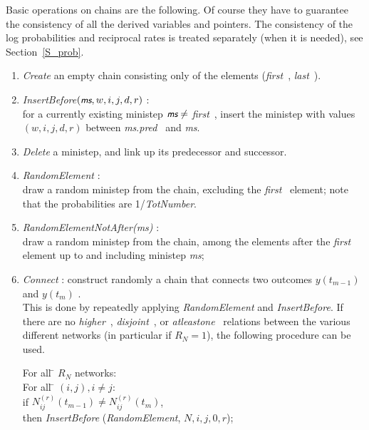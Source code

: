 \documentclass[a4paper,12pt,fleqn]{article}
\newcommand{\nnm}[1]{\textsf{\small\textit{#1}\ }}
\newcommand{\ms}{\textsl{\textsf{\small ms}}} %
\begin{document}
Basic operations on chains are the following.
Of course they have to guarantee the consistency of all the
derived variables and pointers.
The consistency of the log probabilities and reciprocal rates
is treated separately (when it is needed), see Section~\ref{S_prob}.
\begin{enumerate}
\item \emph{Create} an empty chain consisting only
       of the elements (\nnm{first}, \nnm{last}).
\item \emph{InsertBefore}$(\ms, w,i,j,d,r)$ :\\
      for a currently existing ministep $\ms \neq $  \nnm{first},
      insert the ministep
      with values $(w,i,j,d,r)$ between \ms.\nnm{pred} and \ms.
\item \emph{Delete}  a ministep, and link up its predecessor and successor.
\item \emph{RandomElement}      :\\
      draw a random ministep from the chain,
      excluding the \nnm{first} element;
      note that the probabilities are 1/\textit{TotNumber}.
\item \emph{RandomElementNotAfter(\ms)}      :\\
      draw a random ministep from the chain,
      among the elements after the \nnm{first} element up to and including
      ministep \ms;
\item \emph{Connect} : construct randomly a chain that connects
      two outcomes $y(t_{m-1})$ and $y(t_m)$ .\\
      This is done by repeatedly applying \emph{RandomElement}
      and \emph{InsertBefore}.
      If there are no \nnm{higher}, \nnm{disjoint}, or
      \nnm{atleastone} relations between the various different networks
      (in particular if $R_N = 1$), the following procedure can be used.
      \begin{tabbing}
      For all \= $R_N$ networks:\\
         \> For all \= $(i,j), i \neq j$:\\
          \> \> if $N^{(r)}_{ij}(t_{m-1}) \neq N^{(r)}_{ij}(t_m)$, \\
            \> \> then \textit{InsertBefore}
                               (\textit{RandomElement}, $N,i,j,0,r$);\\

\end{tabbing}
\end{enumerate}
\end{document}
